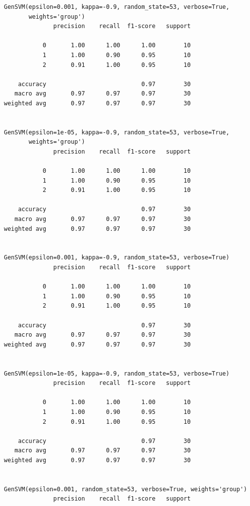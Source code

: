 \documentclass{article}
\begin{document}
\begin{LTR}

\begin{verbatim}
GenSVM(epsilon=0.001, kappa=-0.9, random_state=53, verbose=True,
       weights='group')
              precision    recall  f1-score   support

           0       1.00      1.00      1.00        10
           1       1.00      0.90      0.95        10
           2       0.91      1.00      0.95        10

    accuracy                           0.97        30
   macro avg       0.97      0.97      0.97        30
weighted avg       0.97      0.97      0.97        30


GenSVM(epsilon=1e-05, kappa=-0.9, random_state=53, verbose=True,
       weights='group')
              precision    recall  f1-score   support

           0       1.00      1.00      1.00        10
           1       1.00      0.90      0.95        10
           2       0.91      1.00      0.95        10

    accuracy                           0.97        30
   macro avg       0.97      0.97      0.97        30
weighted avg       0.97      0.97      0.97        30


GenSVM(epsilon=0.001, kappa=-0.9, random_state=53, verbose=True)
              precision    recall  f1-score   support

           0       1.00      1.00      1.00        10
           1       1.00      0.90      0.95        10
           2       0.91      1.00      0.95        10

    accuracy                           0.97        30
   macro avg       0.97      0.97      0.97        30
weighted avg       0.97      0.97      0.97        30


GenSVM(epsilon=1e-05, kappa=-0.9, random_state=53, verbose=True)
              precision    recall  f1-score   support

           0       1.00      1.00      1.00        10
           1       1.00      0.90      0.95        10
           2       0.91      1.00      0.95        10

    accuracy                           0.97        30
   macro avg       0.97      0.97      0.97        30
weighted avg       0.97      0.97      0.97        30


GenSVM(epsilon=0.001, random_state=53, verbose=True, weights='group')
              precision    recall  f1-score   support


\end{verbatim}
\end{LTR}
\end{document}
